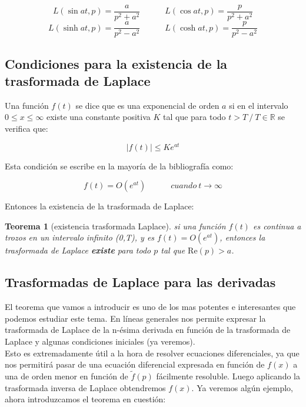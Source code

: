 \documentclass[12pt]{book}
\newcommand{\Real}{\mathrm{Re}}
\newcommand{\tquad}{\quad  \quad \quad}
\newtheorem{theorem}{Teorema}[section]
\begin{document}
\begin{equation}
L (\sin at,p) = \dfrac{a}{p^2 + a^2} \tquad 
L (\cos at,p) = \dfrac{p}{p^2 + a^2}
\end{equation}
\begin{equation}
L (\sinh at,p) = \dfrac{a}{p^2 - a^2} \tquad 
L (\cosh at,p) = \dfrac{p}{p^2 - a^2}
\end{equation}



\subsection{Condiciones para la existencia de la trasformada de Laplace} \label{Subsec:6.3.3}

Una función $f(t)$ se dice que es una exponencial de orden $a$ si en el intervalo $0 \leq x \leq \infty$ existe una constante positiva $K$ tal que para todo $t >  T \ / \ T \in \mathbb{R}$ se verifica que:

\begin{equation}
|f(t)| \leq K e^{at}
\end{equation}

Esta condición se escribe en la mayoría de la bibliografía como:

$$ f(t) = O(e^{at}) \tquad cuando \ t \rightarrow \infty $$

Entonces la existencia de la trasformada de Laplace:

\begin{theorem}[existencia trasformada Laplace]
si una función $f(t)$ es continua a trozos en un intervalo infinito (0,T), y es $f(t)=O(e^{at})$, entonces la trasformada de Laplace \textbf{existe} para todo $p$ tal que $\Real( p ) > a$.\\
\end{theorem} 


\subsection{Trasformadas de Laplace para las derivadas}

El teorema que vamos a introducir es uno de los mas potentes e interesantes que podemos estudiar este tema. En líneas generales nos permite expresar la trasformada de Laplace de la n-ésima derivada en función de la trasformada de Laplace y algunas condiciones iniciales (ya veremos). \\

Esto es extremadamente útil a la hora de resolver ecuaciones diferenciales, ya que nos permitirá pasar de una ecuación diferencial expresada en función de $f(x)$ a una de orden menor en función de $\tilde{f}(p)$ fácilmente resoluble. Luego aplicando la trasformada inversa de Laplace obtendremos $f(x)$. Ya veremos algún ejemplo, ahora introduzcamos el teorema en cuestión:
\end{document}
